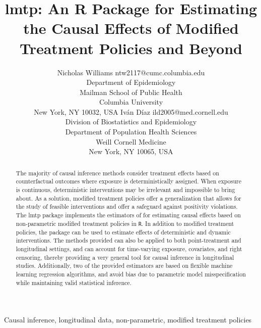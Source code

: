 \documentclass[twoside,11pt]{article}
\begin{document}
\title{lmtp: An R Package for Estimating the Causal Effects of Modified Treatment Policies and Beyond}

\author{\name Nicholas Williams \email ntw2117@cumc.columbia.edu \\
       \addr Department of Epidemiology \\
       Mailman School of Public Health \\
       Columbia University \\
       New York, NY 10032, USA
       \AND
       \name Iván Díaz \email ild2005@med.cornell.edu \\
       \addr Division of Biostatistics and Epidemiology \\
       Department of Population Health Sciences \\
       Weill Cornell Medicine \\
       New York, NY 10065, USA}

\maketitle

\begin{abstract}%
The majority of causal inference methods consider treatment effects based on counterfactual outcomes where exposure is deterministically assigned. When exposure is continuous, deterministic interventions may be irrelevant and impossible to bring about. As a solution, modified treatment policies offer a generalization that allows for the study of feasible interventions and offer a safeguard against positivity violations. The lmtp package implements the estimators of \citet{jasaLMTP} for estimating causal effects based on non-parametric modified treatment policies in \texttt{R}. In addition to modified treatment policies, the package can be used to estimate effects of deterministic and dynamic interventions. The methods provided can also be applied to both point-treatment and longitudinal settings, and can account for time-varying exposure, covariates, and right censoring, thereby providing a very general tool for causal inference in longitudinal studies. Additionally, two of the provided estimators are based on flexible machine learning regression algorithms, and avoid bias due to parametric model misspecification while maintaining valid statistical inference.
\end{abstract}

\begin{keywords}
Causal inference, longitudinal data, non-parametric, modified treatment policies
\end{keywords}
\end{document}
